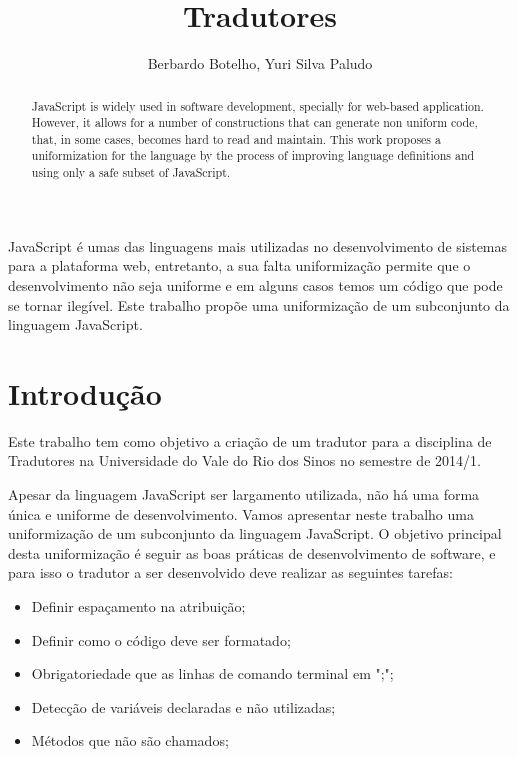 \documentclass[12pt]{article}
\title{Tradutores}
\author{Berbardo Botelho\inst{1}, Yuri Silva Paludo\inst{1}}
\begin{document}
 

\maketitle

\begin{abstract}
JavaScript is widely used in software development, specially for web-based application. However, it allows for a number of constructions that can generate non uniform code, that, in some cases, becomes hard to read and maintain. This work proposes a uniformization for the language by the process of improving language definitions and using only a safe subset of JavaScript.
\end{abstract}
     
\begin{resumo} 
JavaScript é umas das linguagens mais utilizadas no desenvolvimento de sistemas para a plataforma web, entretanto, a sua falta uniformização permite que o desenvolvimento não seja uniforme e em alguns casos temos um código que pode se tornar ilegível. Este trabalho propõe uma uniformização de um subconjunto da linguagem JavaScript.
\end{resumo}

\section{Introdução}
Este trabalho tem como objetivo a criação de um tradutor para a disciplina de Tradutores na Universidade do Vale do Rio dos Sinos no semestre de 2014/1.

Apesar da linguagem JavaScript ser largamento utilizada, não há uma forma única e uniforme de desenvolvimento. Vamos apresentar neste trabalho uma uniformização de um subconjunto da linguagem JavaScript. O objetivo principal desta uniformização é seguir as boas práticas de desenvolvimento de software, e para isso o tradutor a ser desenvolvido deve realizar as seguintes tarefas:

\begin{itemize}
\item Definir espaçamento na atribuição;
\item Definir como o código deve ser formatado;
\item Obrigatoriedade que as linhas de comando terminal em ";";
\item Detecção de variáveis declaradas e não utilizadas;
\item Métodos que não são chamados;
\end{itemize}
\end{document}
